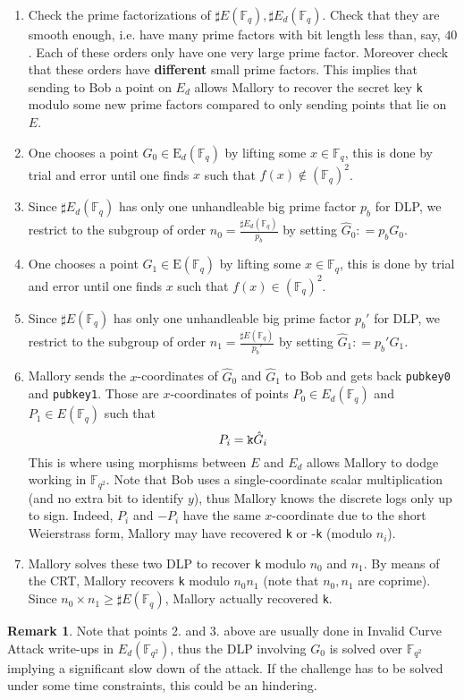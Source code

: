 \documentclass[10pt]{article}
\theoremstyle{definition}
\newtheorem{remark}{Remark}
\newcommand{\F}{\mathbb{F}}
\newcommand{\E}{\textrm{E}}
\begin{document}
\begin{enumerate}
\item Check the prime factorizations of $\sharp{}E(\F_q), \sharp{}E_d(\F_q)$.
Check that they are smooth enough, i.e. have many prime factors with bit length less than, say, $40$.
Each of these orders only have one very large prime factor.
Moreover check that these orders have \textbf{different} small prime factors.
This implies that sending to Bob a point on $E_d$ allows Mallory to recover the secret key \verb|k| modulo some new prime factors compared to only sending points that lie on $E$.
\item One chooses a point $G_0 \in \E_d(\F_q)$ by lifting some $x\in \F_q$, this is done by trial and error until one finds $x$ such that $f(x) \notin (\F_q)^2$. 
\item Since $\sharp{}E_d(\F_q)$ has only one unhandleable big prime factor $p_b$ for DLP, we restrict to the subgroup of order $n_0 = \frac{\sharp{}E_d(\F_q)}{p_b}$ by setting $\hat{G}_0 : = p_b G_0$.
\item One chooses a point $G_1 \in \E(\F_q)$ by lifting some $x\in \F_q$, this is done by trial and error until one finds $x$ such that $f(x) \in (\F_q)^2$. 
\item Since $\sharp{}E(\F_q)$ has only one unhandleable big prime factor $p_b'$ for DLP, we restrict to the subgroup of order $n_1 = \frac{\sharp{}E(\F_q)}{p_b'}$ by setting $\hat{G}_1 : = p_b' G_1$.
\item Mallory sends the $x$-coordinates of $\hat{G}_0$ and $\hat{G}_1$ to Bob and gets back \verb|pubkey0| and \verb|pubkey1|.
Those are $x$-coordinates of points $P_0 \in E_d(\F_q)$ and $P_1 \in E(\F_q)$ such that 
\[ P_i = \verb|k|\hat{G}_i \]
This is where using morphisms between $E$ and $E_d$ allows Mallory to dodge working in $\F_{q^2}$.
Note that Bob uses a single-coordinate scalar multiplication (and no extra bit to identify $y$), thus Mallory knows the discrete logs only up to sign. 
Indeed, $P_i$ and $-P_i$ have the same $x$-coordinate due to the short Weierstrass form, Mallory may have recovered \verb|k| or -\verb|k| (modulo $n_i$).
\item Mallory solves these two DLP to recover \verb|k| modulo $n_0$  and $n_1$.
By means of the CRT, Mallory recovers \verb|k| modulo $n_0n_1$ (note that $n_0, n_1$ are coprime).
Since $n_0 \times n_1 \geq \sharp{}E(\F_q)$, Mallory  actually recovered \verb|k|.


\end{enumerate}

\begin{remark}
Note that points 2. and 3. above are usually done in Invalid Curve Attack write-ups in $E_d(\F_{q^2})$, thus the DLP involving $G_0$ is solved over $\F_{q^2}$ implying a significant slow down of the attack.
If the challenge has to be solved under some time constraints, this could be an hindering.
\end{remark}




\end{document}
